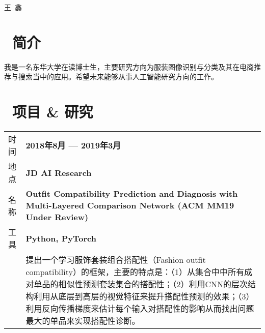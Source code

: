 \documentclass[a4paper, oneside, final]{scrartcl} %
\newcommand{\gray}{\rowcolor[gray]{.90}} %
\begin{document}
\begin{center} %


{\fontsize{36}{36}\selectfont\scshape 王\ 鑫} %


\section{\faInfo\ 简介}
\begin{flushleft}
我是一名东华大学在读博士生，主要研究方向为服装图像识别与分类及其在电商推荐与搜索当中的应用。希望未来能够从事人工智能研究方向的工作。
\end{flushleft}


\section{\faUsers\ 项目 \& 研究}

\begin{tabularx}{0.97\linewidth}{>{\raggedleft\scshape}p{2cm}X}
\gray 时间 & \textbf{2018年8月 --- 2019年3月}\\
\gray 地点 & \textbf{JD AI Research} \\
\gray 名称 & \textbf{Outfit Compatibility Prediction and Diagnosis with Multi-Layered Comparison Network (ACM MM19 Under Review)}\\
\gray 工具 & \textbf{Python, PyTorch}\\
& 提出一个学习服饰套装组合搭配性（Fashion outfit compatibility）的框架，主要的特点是：（1）从集合中中所有成对单品的相似性预测套装集合的搭配性；（2）利用CNN的层次结构利用从底层到高层的视觉特征来提升搭配性预测的效果；（3）利用反向传播梯度来估计每个输入对搭配性的影响从而找出问题最大的单品来实现搭配性诊断。
\end{tabularx}


\end{center}
\end{document}

